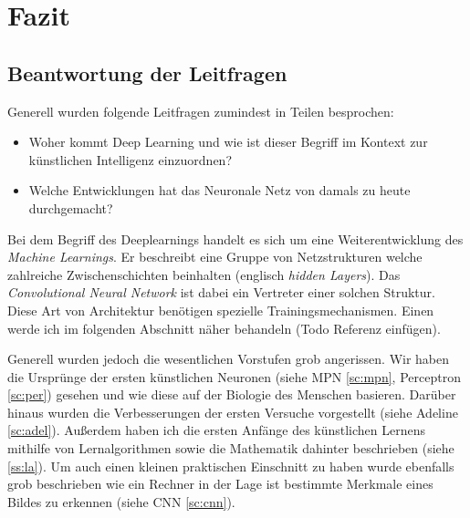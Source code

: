\section{Fazit}


\subsection{Beantwortung der Leitfragen}

Generell wurden folgende Leitfragen zumindest in Teilen besprochen: 

\begin{itemize}
\item Woher kommt Deep Learning und wie ist dieser Begriff im Kontext zur künstlichen Intelligenz einzuordnen?
\item Welche Entwicklungen hat das Neuronale Netz von damals zu heute durchgemacht?
\end{itemize}

Bei dem Begriff des Deeplearnings handelt es sich um eine Weiterentwicklung des \emph{Machine Learnings}. Er beschreibt eine Gruppe von Netzstrukturen welche zahlreiche Zwischenschichten beinhalten (englisch \emph{hidden Layers}). Das \emph{Convolutional Neural Network} ist dabei ein Vertreter einer solchen Struktur. Diese Art von Architektur benötigen spezielle Trainingsmechanismen. Einen werde ich im folgenden Abschnitt näher behandeln (Todo Referenz einfügen). 

Generell wurden jedoch die wesentlichen Vorstufen grob angerissen. Wir haben die Ursprünge der ersten künstlichen Neuronen (siehe MPN \ref{sc:mpn}, Perceptron \ref{sc:per}) gesehen und wie diese auf der Biologie des Menschen basieren. Darüber hinaus wurden die Verbesserungen der ersten Versuche vorgestellt (siehe Adeline \ref{sc:adel}). Außerdem haben ich die ersten Anfänge des künstlichen Lernens mithilfe von Lernalgorithmen sowie die Mathematik dahinter beschrieben (siehe \ref{ss:la}). Um auch einen kleinen praktischen Einschnitt zu haben wurde ebenfalls grob beschrieben wie ein Rechner in der Lage ist bestimmte Merkmale eines Bildes zu erkennen (siehe CNN \ref{sc:cnn}). 
